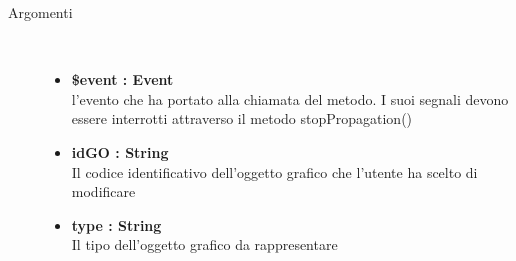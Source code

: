\begin{description}
\begin{description}
		\begin{description}
			\item[Argomenti] \hfill \\
				\begin{itemize}
				
					\item \textbf{\$event : Event	} \hfill \\
					l'evento che ha portato alla chiamata del metodo. I suoi segnali devono essere interrotti attraverso il metodo stopPropagation()		
					\item \textbf{idGO : String	} \hfill \\
					Il codice identificativo dell'oggetto grafico che l'utente ha scelto di modificare
					\item \textbf{type : String	} \hfill \\
					Il tipo dell'oggetto grafico da rappresentare
				\end{itemize}
				
		\end{description}
	\end{description}
	
	
	
\end{description}